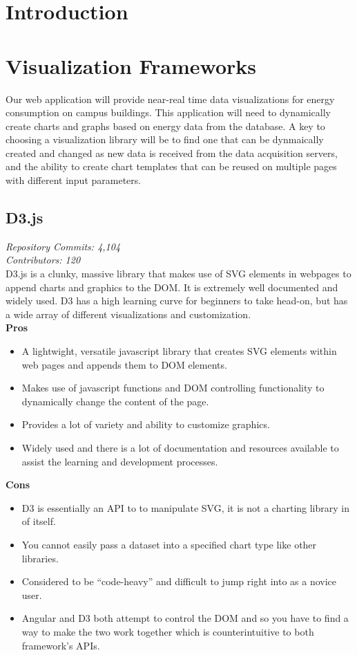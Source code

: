 \documentclass[onecolumn, draftclsnofoot,10pt, compsoc]{IEEEtran}
\begin{document}
\section{Introduction}

\section{Visualization Frameworks}
Our web application will provide near-real time data visualizations for energy consumption on campus buildings. This application will need to dynamically create charts and graphs based on energy data from the database. A key to choosing a visualization library will be to find one that can be dynmaically created and changed as new data is received from the data acquisition servers, and the ability to create chart templates that can be reused on multiple pages with different input parameters. 

\subsection{D3.js}
\textit{Repository Commits: 4,104}\\  
\textit{Contributors: 120}\\
D3.js is a clunky, massive library that makes use of SVG elements in webpages to append charts and graphics to the DOM. It is extremely well documented and widely used. D3 has a high learning curve for beginners to take head-on, but has a wide array of different visualizations and customization.\\
\textbf{Pros}
\begin{itemize}
\item A lightwight, versatile javascript library that creates SVG elements within web pages and appends them to DOM elements. 
\item Makes use of javascript functions and DOM controlling functionality to dynamically change the content of the page. 
\item Provides a lot of variety and ability to customize graphics.
\item Widely used and there is a lot of documentation and resources available to assist the learning and development processes.
\end{itemize}
\textbf{Cons}
\begin{itemize}
\item D3 is essentially an API to to manipulate SVG, it is not a charting library in of itself.
\item You cannot easily pass a dataset into a specified chart type like other libraries.
\item Considered to be ``code-heavy'' and difficult to jump right into as a novice user.
\item Angular and D3 both attempt to control the DOM and so you have to find a way to make the two work together which is counterintuitive to both framework's APIs. 
\end{itemize}
\end{document}
